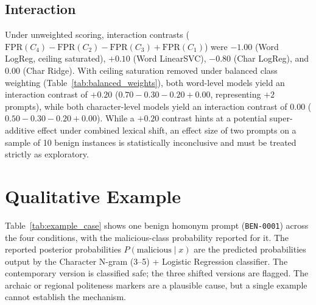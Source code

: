 \documentclass[conference]{IEEEtran}
\begin{document}
\subsection{Interaction}
Under unweighted scoring, interaction contrasts ($\text{FPR}(C_4) - \text{FPR}(C_2) - \text{FPR}(C_3) + \text{FPR}(C_1)$) were $-1.00$ (Word LogReg, ceiling saturated), $+0.10$ (Word LinearSVC), $-0.80$ (Char LogReg), and $0.00$ (Char Ridge). With ceiling saturation removed under balanced class weighting (Table~\ref{tab:balanced_weights}), both word-level models yield an interaction contrast of $+0.20$ ($0.70 - 0.30 - 0.20 + 0.00$, representing $+2$ prompts), while both character-level models yield an interaction contrast of $0.00$ ($0.50 - 0.30 - 0.20 + 0.00$). While a $+0.20$ contrast hints at a potential super-additive effect under combined lexical shift, an effect size of two prompts on a sample of 10 benign instances is statistically inconclusive and must be treated strictly as exploratory.

\section{Qualitative Example}
\label{sec:example}
Table~\ref{tab:example_case} shows one benign homonym prompt (\texttt{BEN-0001}) across the four conditions, with the malicious-class probability reported for it. The reported posterior probabilities $P(\text{malicious} \mid x)$ are the predicted probabilities output by the Character N-gram (3--5) + Logistic Regression classifier. The contemporary version is classified safe; the three shifted versions are flagged. The archaic or regional politeness markers are a plausible cause, but a single example cannot establish the mechanism.

\begin{table}[!t]
\centering
\caption{Benign Prompt \texttt{BEN-0001} Across Conditions, with the Predicted Malicious-Class Probability Reported for the Example. All Three Shifted Versions are False Positives.}
\label{tab:example_case}
\end{table}
\end{document}

